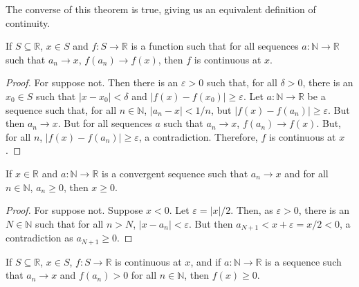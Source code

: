             The converse of this theorem is true, giving us
            an equivalent definition of continuity.
            \begin{theorem}
                If $S\subseteq\mathbb{R}$, $x\in{S}$ and
                $f:S\rightarrow\mathbb{R}$
                is a function such that for all sequences
                $a:\mathbb{N}\rightarrow\mathbb{R}$ such that
                $a_{n}\rightarrow{x}$,
                $f(a_{n})\rightarrow{f(x)}$,
                then $f$ is continuous at $x$.
            \end{theorem}
            \begin{proof}
                For suppose not. Then there is an
                $\varepsilon>0$ such that, for all $\delta>0$,
                there is an $x_{0}\in{S}$ such that
                $|x-x_{0}|<\delta$ and
                $|f(x)-f(x_{0})|\geq\varepsilon$.
                Let $a:\mathbb{N}\rightarrow\mathbb{R}$
                be a sequence such that, for all
                $n\in\mathbb{N}$, $|a_{n}-x|<1/n$, but
                $|f(x)-f(a_{n})|\geq\varepsilon$.
                But then $a_{n}\rightarrow{x}$. But for all
                sequences $a$ such that $a_{n}\rightarrow{x}$,
                $f(a_{n})\rightarrow{f(x)}$. But, for all $n$,
                $|f(x)-f(a_{n})|\geq\varepsilon$,
                a contradiction.
                Therefore, $f$ is continuous at $x$.
            \end{proof}
            \begin{theorem}
                If $x\in\mathbb{R}$ and
                $a:\mathbb{N}\rightarrow\mathbb{R}$
                is a convergent sequence such that
                $a_{n}\rightarrow{x}$ and for all
                $n\in\mathbb{N}$, $a_{n}\geq{0}$,
                then $x\geq{0}$.
            \end{theorem}
            \begin{proof}
                For suppose not. Suppose $x<0$. Let
                $\varepsilon=|x|/2$. Then, as $\varepsilon>0$, there
                is an $N\in\mathbb{N}$ such that for all $n>N$,
                $|x-a_{n}|<\varepsilon$. But then
                $a_{N+1}<x+\varepsilon=x/2<0$, a contradiction as
                $a_{N+1}\geq{0}$.
            \end{proof}
            \begin{theorem}
                \label{thm:Funct:Continuous_Limit_%
                       of_Pos_Sequ_is_nonneg}
                If $S\subseteq\mathbb{R}$, $x\in{S}$,
                $f:S\rightarrow\mathbb{R}$ is continuous at $x$, and if
                $a:\mathbb{N}\rightarrow\mathbb{R}$ is a sequence such
                that  $a_{n}\rightarrow{x}$ and $f(a_{n})>0$
                for all $n\in\mathbb{N}$, then $f(x)\geq{0}$.
            \end{theorem}
